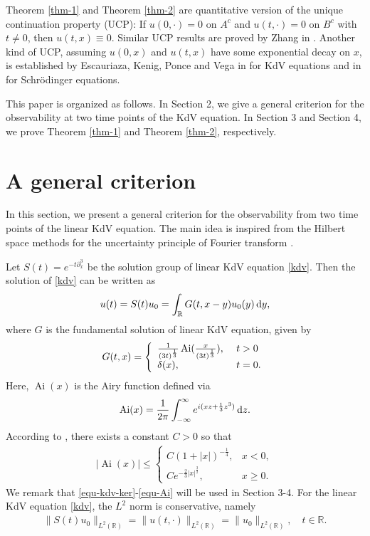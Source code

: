 \documentclass[12pt]{amsart}
\def\R {\mathbb{R}}
\def\d{{\,\rm d}}
\theoremstyle{definition}
\numberwithin{equation}{section}
\begin{document}
Theorem \ref{thm-1} and Theorem \ref{thm-2} are quantitative version of the unique continuation property (UCP): If $u(0,\cdot)=0$ on $A^c$ and $u(t,\cdot)=0$ on $B^c$ with $t\neq 0$, then $u(t,x)\equiv 0$. Similar UCP results are proved by Zhang in \cite{zhang-kdv,zhang-sch}. Another kind of UCP, assuming $u(0,x)$ and $u(t,x)$ have some exponential decay on $x$, is established by Escauriaza,   Kenig, Ponce and Vega in \cite{EKPV-kdv} for KdV equations and in \cite{EKPV12} for Schr\"{o}dinger equations.

This paper is organized as follows. In Section 2, we give a general criterion for the observability at two time points of the KdV equation. In Section 3 and Section 4, we prove Theorem \ref{thm-1} and Theorem \ref{thm-2}, respectively.


\section{A general criterion}

In this section, we present a general criterion for the observability from two time points of the linear KdV equation. The main idea is inspired from the Hilbert space methods for the uncertainty principle of Fourier transform \cite[Part One, Chap. 3]{Havin}.

Let $S(t)=e^{-t\partial_x^3}$ be the solution group of linear KdV equation \eqref{kdv}. Then the solution of  \eqref{kdv} can be written as
\begin{align}\label{equ-kdv-solu}
u(t)=S(t)u_0=\int_\R G(t,x-y)u_0(y)\d y,
\end{align}
where $G$ is the fundamental solution of linear KdV equation, given by
\begin{align}\label{equ-kdv-ker}
    G(t,x)= \left\{
        \begin{array}{ll}
        \frac{1}{(3t)^{\frac{1}{3}}}\operatorname{Ai}(\frac{x}{(3t)^{\frac{1}{3}}}), & \hbox{ }t> 0 \\
        \delta(x), & \hbox{ }t=0.
        \end{array}
        \right.
\end{align}
Here, $\operatorname{Ai}(x)$ is the Airy function defined via
\begin{align*}
\operatorname{Ai}(x)= \frac{1}{2\pi}\int^{\infty}_{-\infty}e^{i(xz+\frac{1}{3}z^3)}\d z.
\end{align*}
According to \cite[p.330]{stein}, there exists a constant $C>0$ so that
\begin{align}\label{equ-Ai}
|\operatorname{Ai}(x)| \leq
\left\{
\begin{array}{ll}
C(1+|x|)^{-\frac{1}{4}}, &   x<0, \\
 Ce^{-\frac{2}{3}|x|^{\frac{3}{2}}}, &  x\geq 0.
\end{array}
\right.
\end{align}
We remark that \eqref{equ-kdv-ker}-\eqref{equ-Ai} will be used in Section 3-4. For the linear KdV equation \eqref{kdv}, the $L^2$ norm is conservative, namely
\begin{align}\label{equ-conservation-law}
\|S(t)u_0\|_{L^2(\R)}=\|u(t,\cdot)\|_{L^2(\R)}=\|u_0\|_{L^2(\R)}, \quad t\in \R.
\end{align}
\end{document}
